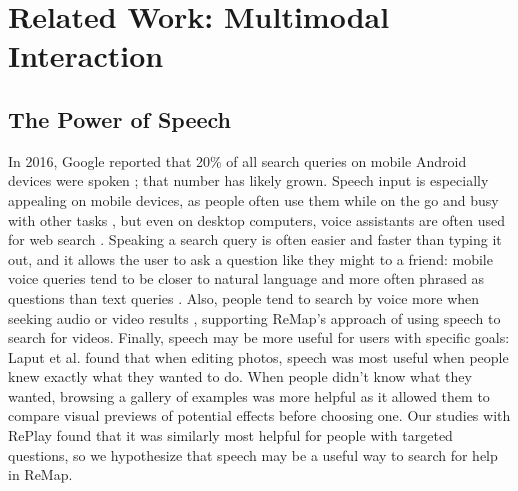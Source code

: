\section{Related Work: Multimodal Interaction}
\subsection{The Power of Speech}
In 2016, Google reported that 20\% of all search queries on mobile Android devices were spoken \cite{Pichai2016}; that number has likely grown. Speech input is especially appealing on mobile devices, as people often use them while on the go and busy with other tasks \cite{Guy2016}, but even on desktop computers, voice assistants are often used for web search \cite{Mehrotra2016}. Speaking a search query is often easier and faster than typing it out, and it allows the user to ask a question like they might to a friend: mobile voice queries tend to be closer to natural language and more often phrased as questions than text queries \cite{Guy2016}. Also, people tend to search by voice more when seeking audio or video results \cite{Guy2016}, supporting ReMap's approach of using speech to search for videos. Finally, speech may be more useful for users with specific goals: Laput et al. \cite{Laput2013} found that when editing photos, speech was most useful when people knew exactly what they wanted to do. When people didn't know what they wanted, browsing a gallery of examples was more helpful as it allowed them to compare visual previews of potential effects before choosing one. Our studies with RePlay found that it was similarly most helpful for people with targeted questions, so we hypothesize that speech may be a useful way to search for help in ReMap.


